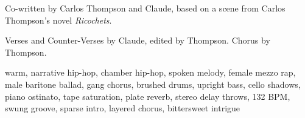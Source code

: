 
\begin{notes}
Co-written by Carlos Thompson and Claude, based on a scene from Carlos Thompson's novel \emph{Ricochets}.

Verses and Counter-Verses by Claude, edited by Thompson. Chorus by Thompson.
\end{notes}
\begin{style}
warm, narrative hip-hop, chamber hip-hop, spoken melody, female mezzo rap, male baritone ballad, gang chorus, brushed drums, upright bass, cello shadows, piano ostinato, tape saturation, plate reverb, stereo delay throws, 132 BPM, swung groove, sparse intro, layered chorus, bittersweet intrigue
\end{style}
